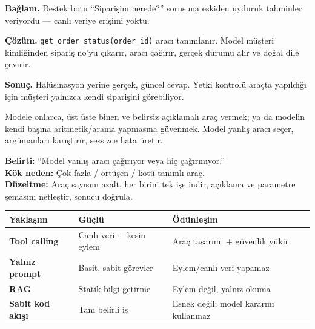 \begin{prodbox}
\textbf{Bağlam.} Destek botu ``Siparişim nerede?'' sorusuna eskiden uyduruk
tahminler veriyordu --- canlı veriye erişimi yoktu.

\smallskip
\textbf{Çözüm.} \texttt{get\_order\_status(order\_id)} aracı tanımlanır. Model
müşteri kimliğinden sipariş no'yu çıkarır, aracı çağırır, gerçek durumu alır ve
doğal dile çevirir.

\smallskip
\textbf{Sonuç.} Halüsinasyon yerine gerçek, güncel cevap. Yetki kontrolü araçta
yapıldığı için müşteri yalnızca kendi siparişini görebiliyor.
\end{prodbox}

\begin{antibox}
Modele onlarca, üst üste binen ve belirsiz açıklamalı araç vermek; ya da
modelin kendi başına aritmetik/arama yapmasına güvenmek. Model yanlış aracı
seçer, argümanları karıştırır, sessizce hata üretir.

\smallskip
\textbf{Belirti:} ``Model yanlış aracı çağırıyor veya hiç çağırmıyor.''\\
\textbf{Kök neden:} Çok fazla / örtüşen / kötü tanımlı araç.\\
\textbf{Düzeltme:} Araç sayısını azalt, her birini tek işe indir, açıklama ve parametre şemasını netleştir, sonucu doğrula.
\end{antibox}

\vspace{2pt}
\begin{tabularx}{\linewidth}{@{}>{\raggedright\arraybackslash}p{28mm} L L@{}}
\toprule
{\sffamily\bfseries\small Yaklaşım} & {\sffamily\bfseries\small Güçlü} & {\sffamily\bfseries\small Ödünleşim} \\
\midrule
\textbf{Tool calling} & Canlı veri + kesin eylem & Araç tasarımı + güvenlik yükü \\
\addlinespace[2pt]
\textbf{Yalnız prompt} & Basit, sabit görevler & Eylem/canlı veri yapamaz \\
\addlinespace[2pt]
\textbf{RAG} & Statik bilgi getirme & Eylem değil, yalnız okuma \\
\addlinespace[2pt]
\textbf{Sabit kod akışı} & Tam belirli iş & Esnek değil; model kararını kullanmaz \\
\bottomrule
\end{tabularx}

